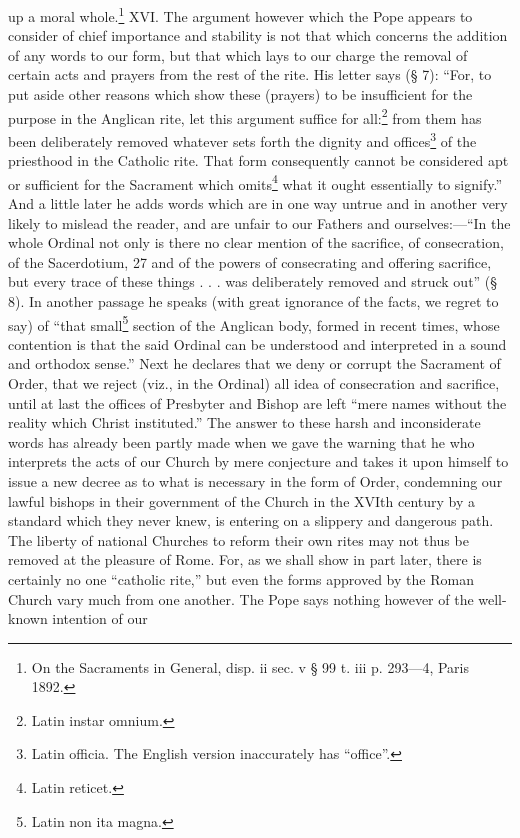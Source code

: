 up a moral whole.\footnote{On the Sacraments in General, disp. ii sec. v § 99 t. iii p. 293—4, Paris 1892.} XVI. The argument however which the Pope appears to consider of chief importance and stability is not that which concerns the addition of any words to our form, but that which lays to our charge the removal of certain acts and prayers from the rest of the rite. His letter says (§ 7): “For, to put aside other reasons which show these (prayers) to be insufficient for the purpose in the Anglican rite, let this argument suffice for all:\footnote{Latin instar omnium.} from them has been deliberately removed whatever sets forth the dignity and offices\footnote{Latin officia. The English version inaccurately has “office”.} of the priesthood in the Catholic rite. That form consequently cannot be considered apt or sufficient for the Sacrament which omits\footnote{Latin reticet.} what it ought essentially to signify.” And a little later he adds words which are in one way untrue and in another very likely to mislead the reader, and are unfair to our Fathers and ourselves:—“In the whole Ordinal not only is there no clear mention of the sacrifice, of consecration, of the Sacerdotium, 27 and of the powers of consecrating and offering sacrifice, but every trace of these things . . . was deliberately removed and struck out” (§ 8). In another passage he speaks (with great ignorance of the facts, we regret to say) of “that small\footnote{Latin non ita magna.} section of the Anglican body, formed in recent times, whose contention is that the said Ordinal can be understood and interpreted in a sound and orthodox sense.” Next he declares that we deny or corrupt the Sacrament of Order, that we reject (viz., in the Ordinal) all idea of consecration and sacrifice, until at last the offices of Presbyter and Bishop are left “mere names without the reality which Christ instituted.” The answer to these harsh and inconsiderate words has already been partly made when we gave the warning that he who interprets the acts of our Church by mere conjecture and takes it upon himself to issue a new decree as to what is necessary in the form of Order, condemning our lawful bishops in their government of the Church in the XVIth century by a standard which they never knew, is entering on a slippery and dangerous path. The liberty of national Churches to reform their own rites may not thus be removed at the pleasure of Rome. For, as we shall show in part later, there is certainly no one “catholic rite,” but even the forms approved by the Roman Church vary much from one another. The Pope says nothing however of the well-known intention of our

